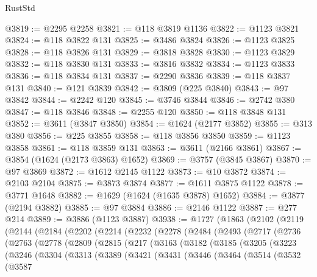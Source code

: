\begin{lexlean}{RustStd}
\begin{coremodule}
@3819 := @2295 @2258
@3821 := @118 @3819 @1136
@3822 := @1123 @3821
@3824 := @118 @3822 @131
@3825 := @3486 @3824
@3826 := @1123 @3825
@3828 := @118 @3826 @131
@3829 := @3818 @3828
@3830 := @1123 @3829
@3832 := @118 @3830 @131
@3833 := @3816 @3832
@3834 := @1123 @3833
@3836 := @118 @3834 @131
@3837 := @2290 @3836
@3839 := @118 @3837 @131
@3840 := @121 @3839
@3842 := @3809 (@225 @3840)
@3843 := @97 @3842
@3844 := @2242 @120
@3845 := @3746 @3844
@3846 := @2742 @380
@3847 := @118 @3846
@3848 := @2255 @120
@3850 := @118 @3848 @131
@3852 := @3611 (@3847 @3850)
@3854 := @1624 (@2177 @3852)
@3855 := @313 @380
@3856 := @225 @3855
@3858 := @118 @3856 @3850
@3859 := @1123 @3858
@3861 := @118 @3859 @131
@3863 := @3611 (@2166 @3861)
@3867 := @3854 (@1624 (@2173 @3863) @1652)
@3869 := @3757 (@3845 @3867)
@3870 := @97 @3869
@3872 := @1612 @2145 @1122
@3873 := @10 @3872
@3874 := @2103 @2104
@3875 := @3873 @3874
@3877 := @1611 @3875 @1122
@3878 := @3771 @1648
@3882 := @1629 (@1624 (@1635 @3878) @1652)
@3884 := @3877 (@2194 @3882)
@3885 := @97 @3884
@3886 := @2146 @1122
@3887 := @277 @214
@3889 := @3886 (@1123 @3887)
@3938 := @1727
    (@1863
      (@2102
        (@2119
          (@2144
            (@2184
              (@2202
                (@2214
                  (@2232
                    (@2278
                      (@2484
                        (@2493
                          (@2717
                            (@2736
                              (@2763
                                (@2778
                                  (@2809
                                    (@2815
                                      (@217
                                        (@3163
                                          (@3182
                                            (@3185
                                              (@3205
                                                (@3223
                                                  (@3246
                                                    (@3304
                                                      (@3313
                                                        (@3389
                                                          (@3421
                                                            (@3431
                                                              (@3446
                                                                (@3464
                                                                  (@3514
                                                                    (@3532
                                                                      (@3587

\end{coremodule}
\end{lexlean}
